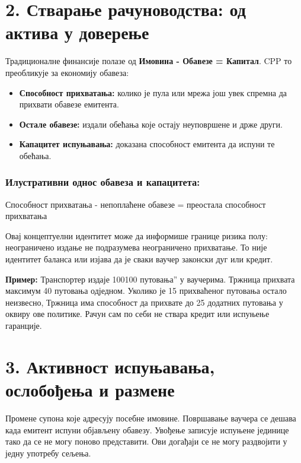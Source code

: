 \documentclass[11pt]{article}
\begin{document}
\section*{2. Стварање рачуноводства: од актива у доверење}

Традиционалне финансије полазе од \textbf{Имовина - Обавезе = Капитал}. CPP то преобликује за економију обавеза:

\begin{itemize}[leftmargin=*]
\item \textbf{Способност прихватања:} колико је пула или мрежа још увек спремна да прихвати обавезе емитента.
\item \textbf{Остале обавезе:} издали обећања које остају неуповршене и држе други.
\item \textbf{Капацитет испуњавања:} доказана способност емитента да испуни те обећања.
\end{itemize}
\subsubsection*{Илустративни однос обавеза и капацитета:}

Способност прихватања - непоплаћене обавезе = преостала способност прихватања

Овај концептуелни идентитет може да информише границе ризика полу: неограничено издање не подразумева неограничено прихватање. То није идентитет баланса или изјава да је сваки ваучер законски дуг или кредит.

\textbf{Пример:} Транспортер издаје 100100 путовања'' у ваучерима. Тржница прихвата максимум 40 путовања одједном. Уколико је 15 прихваћеног путовања остало неизвесно, Тржница има способност да прихвате до 25 додатних путовања у оквиру ове политике. Рачун сам по себи не ствара кредит или испуњење гаранције.



\section*{3. Активност испуњавања, ослобођења и размене}

Промене супона које адресују посебне имовине. Површавање ваучера се дешава када емитент испуни објављену обавезу. Увођење записује испуњене јединице тако да се не могу поново представити. Ови догађаји се не могу раздвојити у једну употребу сељења.
\end{document}
